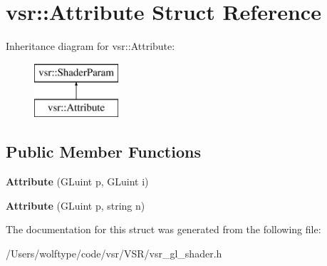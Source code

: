 \hypertarget{structvsr_1_1_attribute}{\section{vsr\-:\-:Attribute Struct Reference}
\label{structvsr_1_1_attribute}
}
Inheritance diagram for vsr\-:\-:Attribute\-:\begin{figure}[H]
\begin{center}
\leavevmode
\includegraphics[height=2.000000cm]{structvsr_1_1_attribute}
\end{center}
\end{figure}
\subsection*{Public Member Functions}
\begin{DoxyCompactItemize}
\item 
\hypertarget{structvsr_1_1_attribute_acbb1ad44b5ec0c3e5db96916afd655f2}{{\bfseries Attribute} (G\-Luint p, G\-Luint i)}\label{structvsr_1_1_attribute_acbb1ad44b5ec0c3e5db96916afd655f2}

\item 
\hypertarget{structvsr_1_1_attribute_a7266c56f75ca7d1e5bd9b2fdf68a1f30}{{\bfseries Attribute} (G\-Luint p, string n)}\label{structvsr_1_1_attribute_a7266c56f75ca7d1e5bd9b2fdf68a1f30}

\end{DoxyCompactItemize}


The documentation for this struct was generated from the following file\-:\begin{DoxyCompactItemize}
\item 
/\-Users/wolftype/code/vsr/\-V\-S\-R/vsr\-\_\-gl\-\_\-shader.\-h\end{DoxyCompactItemize}
